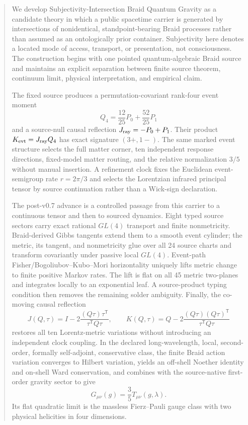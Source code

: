 \documentclass[11pt]{article}
\theoremstyle{definition}
\theoremstyle{remark}
\begin{document}
\begin{abstract}
We develop Subjectivity-Intersection Braid Quantum Gravity as a candidate theory in which a public spacetime carrier is generated by intersections of nonidentical, standpoint-bearing Braid processes rather than assumed as an ontologically prior container. Subjectivity here denotes a located mode of access, transport, or presentation, not consciousness. The construction begins with one pointed quantum-algebraic Braid source and maintains an explicit separation between finite source theorem, continuum limit, physical interpretation, and empirical claim.

The fixed source produces a permutation-covariant rank-four event moment
\[
Q_4=\frac{12}{25}P_0+\frac{52}{25}P_1
\]
and a source-null causal reflection $J_{\rm ray}=-P_0+P_1$. Their product $K_{\rm evt}=J_{\rm ray}Q_4$ has exact signature $(3+,1-)$. The same marked event structure selects the full matter corner, ten independent response directions, fixed-model matter routing, and the relative normalization $3/5$ without manual insertion. A refinement clock fixes the Euclidean event-semigroup rate $r=2\pi/3$ and selects the Lorentzian infrared principal tensor by source continuation rather than a Wick-sign declaration.

The post-v0.7 advance is a controlled passage from this carrier to a continuous tensor and then to sourced dynamics. Eight typed source sectors carry exact rational $GL(4)$ transport and finite nonmetricity. Braid-derived Gibbs tangents extend them to a smooth event cylinder; the metric, its tangent, and nonmetricity glue over all 24 source charts and transform covariantly under passive local $GL(4)$. Event-path Fisher/Bogoliubov--Kubo--Mori horizontality uniquely lifts metric change to finite positive Markov rates. The lift is flat on all 45 metric two-planes and integrates locally to an exponential leaf. A source-product typing condition then removes the remaining solder ambiguity. Finally, the co-moving causal reflection
\[
J(Q,\tau)=I-2\frac{(Q\tau)\tau^{\mathsf T}}{\tau^{\mathsf T}Q\tau},\qquad
K(Q,\tau)=Q-2\frac{(Q\tau)(Q\tau)^{\mathsf T}}{\tau^{\mathsf T}Q\tau}
\]
restores all ten Lorentz-metric variations without introducing an independent clock coupling. In the declared long-wavelength, local, second-order, formally self-adjoint, conservative class, the finite Braid action variation converges to Hilbert variation, yields an off-shell Noether identity and on-shell Ward conservation, and combines with the source-native first-order gravity sector to give
\[
G_{\mu\nu}(g)=\frac35T_{\mu\nu}(g,\lambda).
\]
Its flat quadratic limit is the massless Fierz--Pauli gauge class with two physical helicities in four dimensions.


\end{abstract}
\end{document}
